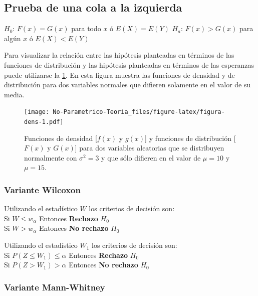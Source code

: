 \documentclass[]{book}
\theoremstyle{definition}
\theoremstyle{definition}
\theoremstyle{definition}
\theoremstyle{remark}
\begin{document}
\hypertarget{prueba-de-una-cola-a-la-izquierda}{%
\subsection{Prueba de una cola a la
izquierda}\label{prueba-de-una-cola-a-la-izquierda}}

\(H_0\): \(F(x)=G(x)\) para todo \(x\) ó \(E(X)=E(Y)\) \(H_a\):
\(F(x)>G(x)\) para algún \(x\) ó \(E(X)<E(Y)\)

Para visualizar la relación entre las hipótesis planteadas en términos
de las funciones de distribución y las hipótesis planteadas en términos
de las esperanzas puede utilizarse la \ref{fig:figura-dens}. En esta
figura muestra las funciones de densidad y de distribución para dos
variables normales que difieren solamente en el valor de su media.

\begin{figure}
\centering
\texttt{[image: No-Parametrico-Teoria\_files/figure-latex/figura-dens-1.pdf]}
\caption{\label{fig:figura-dens}Funciones de densidad {[}\(f(x)\) y
\(g(x)\){]} y funciones de distribución {[}\(F(x)\) y \(G(x)\){]} para
dos variables aleatorias que se distribuyen normalmente con
\(\sigma^2=3\) y que sólo difieren en el valor de \(\mu=10\) y
\(\mu=15\).}
\end{figure}

\hypertarget{variante-wilcoxon-1}{%
\subsubsection{Variante Wilcoxon}\label{variante-wilcoxon-1}}

Utilizando el estadístico \(W\) los criterios de decisión son:\\
Si \(W≤w_\alpha\) Entonces \textbf{Rechazo} \(H_0\)\\
Si \(W>w_\alpha\) Entonces \textbf{No rechazo} \(H_0\)

Utilizando el estadístico \(W_1\) los criterios de decisión son:\\
Si \(P(Z≤W_1 )≤ \alpha\) Entonces \textbf{Rechazo} \(H_0\)\\
Si \(P(Z>W_1 )> \alpha\) Entonces \textbf{No rechazo} \(H_0\)

\hypertarget{variante-mann-whitney-1}{%
\subsubsection{Variante Mann-Whitney}\label{variante-mann-whitney-1}}
\end{document}
